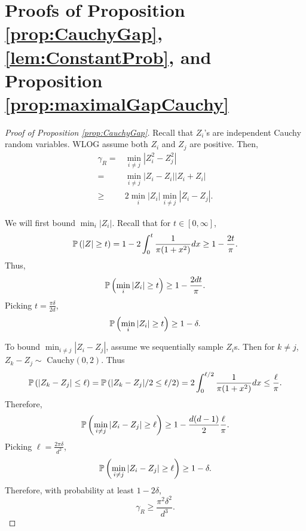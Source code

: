\section{Proofs of Proposition \ref{prop:CauchyGap}, \cref{lem:ConstantProb}, and Proposition \ref{prop:maximalGapCauchy}}
\label{sec:events}
\ICACauchyGap*
\begin{proof}[Proof of Proposition \ref{prop:CauchyGap}]
	Recall that $Z_i$'s are independent Cauchy random variables.
	WLOG assume both $Z_i$ and $Z_j$ are positive. Then, 
	\begin{align*}
	\gamma_R =	& \min_{i\neq j} \left\vert Z_i^2 - Z_j^2 \right\vert \\
	=		& \min_{i\neq j}\left\vert Z_i - Z_i \right\vert	\left\vert Z_i + Z_i \right\vert \\
	\ge 	& 2\min_i\vert Z_i\vert\min_{i\neq j} \left\vert Z_i - Z_j \right\vert.
	\end{align*}
	
	We will first bound $\min_i |Z_i|$. Recall that for $t \in [0, \infty]$,
	$$\mathbb{P}\left(|Z|\ge t\right)  =1-  2\int_{0}^{t} \frac{1}{\pi (1+x^2)} dx \ge 1- \frac{2t}{\pi}.$$ 
	Thus,
	\[
	\mathbb{P}\left(\min_i |Z_i| \ge t\right) \ge 1 - \frac{2dt}{\pi}.
	\]
	Picking $t = \frac{\pi\delta}{2d}$, 
	\[
	\mathbb{P}\left(\min_i |Z_i| \ge t\right) \ge 1-\delta.
	\]
	
	To bound $\min_{i\neq j} \left\vert Z_i - Z_j \right\vert$, assume we sequentially sample $Z_i$s. 
	Then for $k\neq j$, $Z_k -Z_j \sim \text{ Cauchy}(0,2)$. Thus  
	$$
	\mathbb{P}\left( |Z_{k}- Z_j|\le \ell\right) = \mathbb{P}\left( |Z_{k}- Z_j|/2\le \ell/2\right) = 2\int_{0}^{\ell/2} \frac{1}{\pi(1+x^2)}dx \le \frac{\ell}{\pi}.
	$$
	Therefore,
	\begin{equation}
	\label{eq:ProbEZ}
	\mathbb{P}\left(\min_{i\neq j} \left\vert Z_i - Z_j \right\vert \ge \ell\right) \ge 1- \frac{d(d-1)}{2}\frac{\ell}{\pi}.
	\end{equation}
	Picking $\ell = \frac{2\pi\delta}{d^2}$,
	\[
	\mathbb{P}\left(\min_{i\neq j} \left\vert Z_i - Z_j \right\vert \ge \ell\right) \ge 1-\delta.
	\]
	Therefore, with probability at least $1-2\delta$,
	\[
	\gamma_R \ge \frac{\pi^2\delta^2}{d^3}.
	\]
\end{proof}


